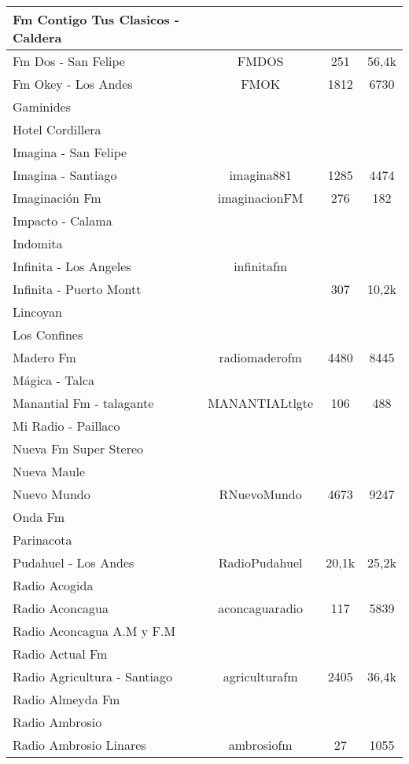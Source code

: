 \begin{center}
\begin{longtable}{| l | c | c | c |}
Fm Contigo Tus Clasicos - Caldera	&		&		&		\\ \hline
Fm Dos - San Felipe	&	FMDOS	&	251	&	56,4k	\\ \hline
Fm Okey - Los Andes	&	FMOK	&	1812	&	6730	\\ \hline
Gaminides	&		&		&		\\ \hline
Hotel Cordillera	&		&		&		\\ \hline
Imagina - San Felipe	&		&		&		\\ \hline
Imagina - Santiago	&	imagina881	&	1285	&	4474	\\ \hline
Imaginación Fm	&	imaginacionFM	&	276	&	182	\\ \hline
Impacto - Calama	&		&		&		\\ \hline
Indomita	&		&		&		\\ \hline
Infinita - Los Angeles	&	infinitafm	&		&		\\ \hline
Infinita - Puerto Montt	&		&	307	&	10,2k	\\ \hline
Lincoyan	&		&		&		\\ \hline
Los Confines	&		&		&		\\ \hline
Madero Fm	&	radiomaderofm	&	4480	&	8445	\\ \hline
Mágica - Talca	&		&		&		\\ \hline
Manantial Fm - talagante	&	MANANTIALtlgte	&	106	&	488	\\ \hline
Mi Radio - Paillaco	&		&		&		\\ \hline
Nueva Fm Super Stereo	&		&		&		\\ \hline
Nueva Maule	&		&		&		\\ \hline
Nuevo Mundo	&	RNuevoMundo	&	4673	&	9247	\\ \hline
Onda Fm	&		&		&		\\ \hline
Parinacota	&		&		&		\\ \hline
Pudahuel - Los Andes	&	RadioPudahuel	&	20,1k	&	25,2k	\\ \hline
Radio Acogida	&		&		&		\\ \hline
Radio Aconcagua	&	aconcaguaradio	&	117	&	5839	\\ \hline
Radio Aconcagua A.M y F.M	&		&		&		\\ \hline
Radio Actual Fm	&		&		&		\\ \hline
Radio Agricultura - Santiago	&	agriculturafm	&	2405	&	36,4k	\\ \hline
Radio Almeyda Fm	&		&		&		\\ \hline
Radio Ambrosio	&		&		&		\\ \hline
Radio Ambrosio Linares	&	ambrosiofm	&	27	&	1055	\\ \hline

\end{longtable}
\end{center}
